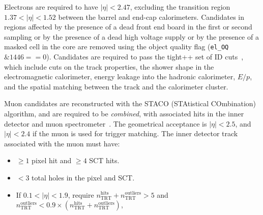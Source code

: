 Electrons are required to have $|\eta|<2.47$, excluding the transition region $1.37<|\eta|<1.52$ between the barrel and end-cap calorimeters. Candidates in regions affected by the presence of a dead front end board in the first or second sampling or by the presence of a dead high voltage supply or by the presence of a masked cell in the core are removed using the object quality flag (\verb.el_OQ.$\&1446==0$). Candidates are required to pass the tight++ set of ID cuts~\cite{Aad:2014fxa}, which include cuts on the track properties, the shower shape in the electromagnetic calorimeter, energy leakage into the hadronic calorimeter, $E/p$, and the spatial matching between the track and the calorimeter cluster. 

Muon candidates are reconstructed with the STACO (STAtistical COmbination) algorithm, and are required to be \emph{combined}, with associated hits in the inner detector and muon spectrometer~\cite{ATLAS-CONF-2013-088}. The geometrical acceptance is $|\eta|<2.5$, and $|\eta|<2.4$ if the muon is used for trigger matching. The inner detector track associated with the muon must have:

\begin{itemize}
  \item $\geq1$ pixel hit and $\geq4$ SCT hits.
  \item $<3$ total holes in the pixel and SCT. 
  \item If $0.1 < |\eta| < 1.9$, require $n_{\mathrm{TRT}}^{\mathrm{hits}}+n_{\mathrm{TRT}}^{\mathrm{outliers}} > 5$ and $n_{\mathrm{TRT}}^{\mathrm{outliers}} < 0.9 \times (n_{\mathrm{TRT}}^{\mathrm{hits}}+n_{\mathrm{TRT}}^{\mathrm{outliers}})$,
\end{itemize}

